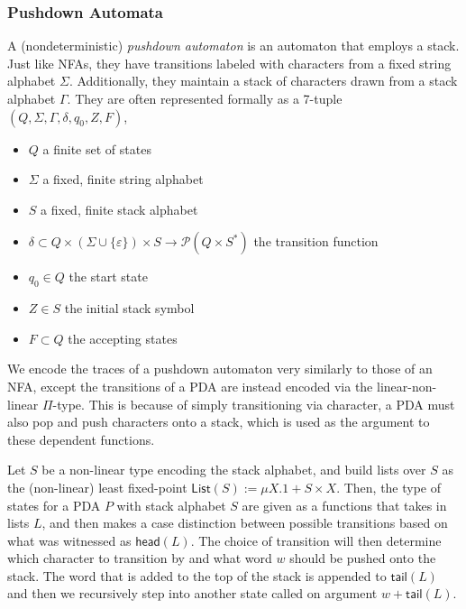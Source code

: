 \documentclass[acmsmall,screen,nonacm]{acmart}
\begin{document}
\subsubsection{Pushdown Automata}
\label{subsubsec:pda}
A (nondeterministic) \emph{pushdown automaton} is an automaton that employs a
stack. Just like NFAs, they have transitions labeled with characters from a
fixed string alphabet $\Sigma$. Additionally, they maintain a stack of
characters drawn from a stack alphabet $\Gamma$. They are often represented
formally as a 7-tuple $(Q, \Sigma, \Gamma, \delta, q_{0}, Z, F)$,

\begin{itemize}
  \item $Q$ a finite set of states
  \item $\Sigma$ a fixed, finite string alphabet
  \item $S$ a fixed, finite stack alphabet
  \item
        $\delta \subset Q \times (\Sigma \cup \{ \varepsilon \}) \times S \to \mathcal{P}(Q \times S^{*})$
        the transition function
  \item $q_{0} \in Q$ the start state
  \item $Z \in S$ the initial stack symbol
  \item $F \subset Q$ the accepting states
\end{itemize}

We encode the traces of a pushdown automaton very similarly to those of an NFA,
except the transitions of a PDA are instead encoded via the linear-non-linear
$\Pi$-type. This is because of simply transitioning via character, a PDA must
also pop and push characters onto a stack, which is used as the argument to
these dependent functions.

Let $S$ be a non-linear type encoding the stack
alphabet, and build lists over $S$ as the (non-linear) least fixed-point
$\mathsf{List}(S) := \mu X . 1 + S \times X$. Then, the type of states for a
PDA $P$ with stack alphabet $S$ are given as a functions that takes in lists $L$,
and then makes a case distinction between possible transitions based on what was witnessed as $\mathsf{head}(L)$. The choice of transition
will then determine which character to transition by and what word $w$ should be
pushed onto the stack. The word that is added to the top of the stack is
appended to $\mathsf{tail}(L)$ and then we recursively step into another state
called on argument $w + \mathsf{tail}(L)$.
\end{document}
